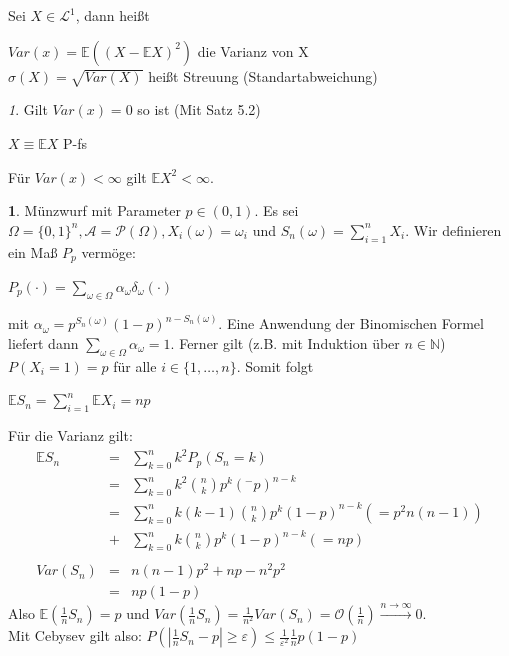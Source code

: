 \documentclass[10pt,a4paper]{report}
\numberwithin{equation}{section}
\numberwithin{figure}{section}
\theoremstyle{plain}
\theoremstyle{definition}
\newtheorem{example}[thm]{\protect\examplename}
\theoremstyle{remark}
\newtheorem{rem}[thm]{\protect\remarkname}
\theoremstyle{plain}
\providecommand{\examplename}{Beispiel}
\providecommand{\remarkname}{Bemerkung}
\newcommand{\1}{ \mathbb{1} } %
\begin{document}
Sei $X \in \mathcal{L}^1$, dann heißt 
\begin{center}
$Var(x)=\mathbb{E}((X-\mathbb{E}X)^2)$ die Varianz von X\\
$\sigma(X)=\sqrt{Var(X)}$ heißt Streuung (Standartabweichung)
\end{center} 
\begin{rem}
  Gilt $Var(x)=0$ so ist (Mit Satz 5.2)
  \begin{center}
    $X\equiv \mathbb{E}X$ P-fs
  \end{center}
  Für $Var(x)<\infty$ gilt $\mathbb{E}X^2< \infty$.
\end{rem}
\begin{example}
  Münzwurf mit Parameter $p \in (0,1)$. Es sei $\Omega=\{0,1\}^n,
  \mathcal{A}=\mathcal{P}(\Omega), X_i(\omega)=\omega_i$ und
  $S_n(\omega)=\sum\limits_{i=1}^n X_i$. Wir definieren ein Maß $P_p$
  vermöge:
  \begin{center}
    $P_p(\cdot)=\sum\limits_{\omega \in \Omega}\alpha_\omega
    \delta_\omega(\cdot)$
  \end{center}
  mit $\alpha_\omega=p^{S_n(\omega)}(1-p)^{n-S_n(\omega)}$. 
  Eine Anwendung der Binomischen Formel liefert dann
  $\sum\limits_{\omega \in \Omega}\alpha_\omega=1$. Ferner gilt
  (z.B. mit Induktion über $n \in \mathbb{N}$) $P(X_i=1)=p$ für alle
  $i \in \{1,\dots,n\}$. Somit folgt
  \begin{center}
    $\mathbb{E}S_n=\sum\limits_{i=1}^n\mathbb{E}X_i=np$
  \end{center}
  Für die Varianz gilt:
  \begin{eqnarray*}
    \mathbb{E}S_n&=&\sum\limits_{k=0}^nk^2P_p(S_n=k)\\
    &=& \sum\limits_{k=0}^nk^2\binom{n}{k}p^k(^-p)^{n-k}\\
    &=&\sum\limits_{k=0}^nk(k-1)\binom{n}{k}p^k(1-p)^{n-k} (=p^2n(n-1))\\
    &+& \sum\limits_{k=0}^n k\binom{n}{k}p^k(1-p)^{n-k} (=np)\\\\
    Var(S_n)&=&n(n-1)p^2+np-n^2p^2\\
    &=&np(1-p)
  \end{eqnarray*}
  Also $\mathbb{E}\left(\frac{1}{n}S_n\right)=p$ und $Var\left(\frac{1}{n}S_n\right)=\frac{1}{n^2}Var(S_n)=\mathcal{O}\left(\frac{1}{n}\right) \overset{n \to \infty}{\to} 0$.\\
  Mit Cebysev gilt also: $P\left(\left|\frac{1}{n}S_n-p\right|\geq \varepsilon\right)\leq \frac{1}{\varepsilon^2}\frac{1}{n}p(1-p)$
\end{example}
\end{document}
